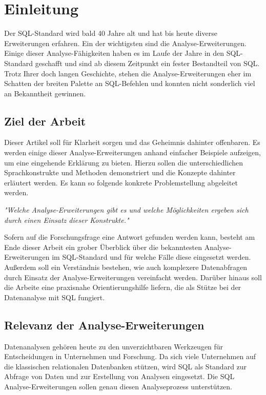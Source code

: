 \chapter{Einleitung}
\label{chap:einleitung} Der SQL-Standard wird bald 40 Jahre alt und hat bis heute
diverse Erweiterungen erfahren. Ein der wichtigsten sind die Analyse-Erweiterungen.
Einige dieser Analyse-Fähigkeiten haben es im Laufe der Jahre in den SQL-Standard
geschafft und sind ab diesem Zeitpunkt ein fester Bestandteil von SQL. Trotz
Ihrer doch langen Geschichte, stehen die Analyse-Erweiterungen eher im Schatten der
breiten Palette an SQL-Befehlen und konnten nicht sonderlich viel an Bekanntheit
gewinnen.


\section{Ziel der Arbeit}
\label{sec:ziel_der_arbeit} Dieser Artikel soll für Klarheit sorgen und das
Geheimnis dahinter offenbaren. Es werden einige dieser Analyse-Erweiterungen anhand
einfacher Beispiele aufzeigen, um eine eingehende Erklärung zu bieten. Hierzu sollen
die unterschiedlichen Sprachkonstrukte und Methoden demonstriert und die Konzepte
dahinter erläutert werden. Es kann so folgende konkrete Problemstellung
abgeleitet werden.
\begin{center}
	\textit{"Welche Analyse-Erweiterungen gibt es und welche Möglichkeiten ergeben
	sich durch einen Einsatz dieser Konstrukte."}
\end{center}
Sofern auf die Forschungsfrage eine Antwort gefunden werden kann, besteht am
Ende dieser Arbeit ein grober Überblick über die bekanntesten Analyse-Erweiterungen
im SQL-Standard und für welche Fälle diese eingesetzt werden. Außerdem soll ein Verständnis
bestehen, wie auch komplexere Datenabfragen durch Einsatz der Analyse-Erweiterungen
vereinfacht werden. Darüber hinaus soll die Arbeite eine praxisnahe Orientierungshilfe
liefern, die als Stütze bei der Datenanalyse mit SQL fungiert.


\section{Relevanz der Analyse-Erweiterungen}
\label{sec:relevant} Datenanalysen gehören heute zu den unverzichtbaren Werkzeugen
für Entscheidungen in Unternehmen und Forschung. Da sich viele Unternehmen auf
die klassischen relationalen Datenbanken stützen, wird SQL als Standard zur Abfrage
von Daten und zur Erstellung von Analysen eingesetzt. Die SQL Analyse-Erweiterungen
sollen genau diesen Analyseprozess unterstützen.

